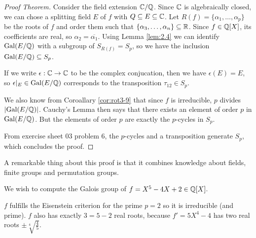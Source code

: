 
\begin{proof}[Proof Theorem]
  Consider the field extension $\mathbb{C}/\mathbb{Q}$. Since $\mathbb{C}$ is algebraically closed, we can chose a splitting field $E$ of $f$ with $Q \subseteq E \subseteq \mathbb{C}$.
  Let $R(f) = \{\alpha_{1}, \ldots, \alpha_{p}\}$ be the roots of $f$ and order them such that $\{\alpha_{3}, \ldots, \alpha_{n}\} \subseteq \mathbb{R}$.
  Since $f \in \mathbb{Q}[X]$, its coefficients are real, so $\alpha_2 = \overline{\alpha_1}$.
  Using Lemma \ref{lem:2.4} we can identify $\operatorname{Gal}(E/\mathbb{Q})$ with a subgroup of $S_{R(f)} = S_p$, so we have the inclusion $\operatorname{Gal}(E/\mathbb{Q}) \subseteq S_p$.

  If we write $\epsilon: \mathbb{C} \to \mathbb{C}$ to be the complex conjucation, then we have $\epsilon(E) = E$, so $\epsilon|_E \in \operatorname{Gal}(E/\mathbb{Q})$ corresponds to the transposition $\tau_{12} \in S_p$.

  We also know from Coroallary \ref{cor:rot3-9} that since $f$ is irreducible, $p$ divides $\abs{\Gal(E/\Q)}$. 
  Cauchy's Lemma then says that there exists an element of order $p$ in $\operatorname{Gal}(E/\mathbb{Q})$.
  But the elements of order $p$ are exactly the $p$-cycles in $S_p$.

  From exercise sheet 03 problem 6, the $p$-cycles and a transposition generate $S_p$, which concludes the proof.
\end{proof}
A remarkable thing about this proof is that it combines knowledge about fields, finite groups and permutation groups.

\begin{ex}[]
  We wish to compute  the Galois group of $f = X^{5} - 4X + 2 \in \mathbb{Q}[X]$.

  $f$ fulfills the Eisenstein criterion for the prime $p = 2$ so it is irreducible (and prime).
  $f$ also has exactly $3 = 5-2$ real roots, because $f'=5X^4 - 4$ has two real roots $\pm \sqrt[4]{\tfrac{4}{5}}$.
\end{ex}

